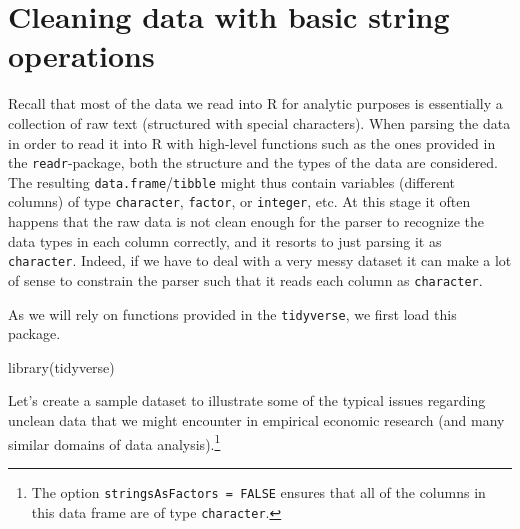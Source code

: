 \documentclass[
  12pt,
]{style/krantz}
\newenvironment{Shaded}{\begin{snugshade}}{\end{snugshade}}
\newcommand{\FunctionTok}[1]{\textcolor[rgb]{0.00,0.00,0.00}{#1}}
\newcommand{\NormalTok}[1]{#1}
\begin{document}
\hypertarget{cleaning-data-with-basic-string-operations}{%
\section{Cleaning data with basic string operations}\label{cleaning-data-with-basic-string-operations}}

Recall that most of the data we read into R for analytic purposes is essentially a collection of raw text (structured with special characters). When parsing the data in order to read it into R with high-level functions such as the ones provided in the \texttt{readr}-package, both the structure and the types of the data are considered. The resulting \texttt{data.frame}/\texttt{tibble} might thus contain variables (different columns) of type \texttt{character}, \texttt{factor}, or \texttt{integer}, etc. At this stage it often happens that the raw data is not clean enough for the parser to recognize the data types in each column correctly, and it resorts to just parsing it as \texttt{character}. Indeed, if we have to deal with a very messy dataset it can make a lot of sense to constrain the parser such that it reads each column as \texttt{character}.

As we will rely on functions provided in the \texttt{tidyverse}, we first load this package.

\begin{Shaded}
\begin{Highlighting}[]
\FunctionTok{library}\NormalTok{(tidyverse)}
\end{Highlighting}
\end{Shaded}

Let's create a sample dataset to illustrate some of the typical issues regarding unclean data that we might encounter in empirical economic research (and many similar domains of data analysis).\footnote{The option \texttt{stringsAsFactors\ =\ FALSE} ensures that all of the columns in this data frame are of type \texttt{character}.}
\end{document}
